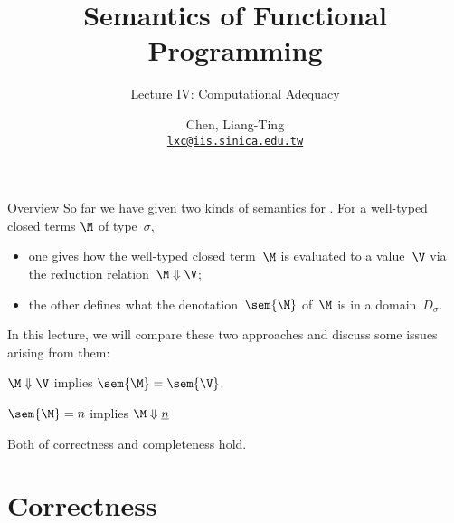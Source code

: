 \title{Semantics of Functional Programming}
\subtitle{Lecture IV: Computational Adequacy}
\author[L.-T. Chen]{Chen, Liang-Ting\\
  \href{mailto:lxc@iis.sinica.edu.tw}{\texttt{lxc@iis.sinica.edu.tw}}}

\frame{\maketitle}

\begin{frame}{Overview}
  So far we have given two kinds of semantics for \PCF{}. For a well-typed
  closed terms $\M$ of
  type~$\sigma$,
  \begin{itemize}
    \item one gives how the well-typed closed term~$\M$ is evaluated to a value~$\V$
      via the reduction relation~$\M \Downarrow\V$;
    \item the other defines what the denotation~$\sem{\M}$ of~$\M$ is in a
      domain~$D_\sigma$. 
    \end{itemize}
  In this lecture, we will compare these two approaches and discuss some issues
  arising from them:
  \begin{description}
    \item[Correctness] $\M \Downarrow \V$ implies $\sem{\M} = \sem{\V}$.
    \item[Completeness] $\sem{\M} = n$ implies $\M \Downarrow \underline{n}$
    \item[Computational adequacy]
      Both of correctness and completeness hold. 
  \end{description}

\end{frame}

\section{Correctness}

